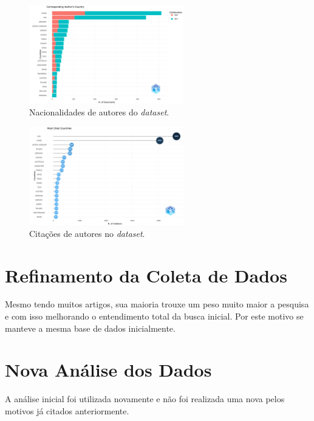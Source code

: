 \begin{figure}
    \centering
    \includegraphics[width=0.6\textwidth]{experiments/tucazorron/PesquisaBibliometrica/GNN/6.png}
    \caption{Nacionalidades de autores do \textit{dataset}.}
    \label{fig:GNN@tucazorron:nationalities}
\end{figure}

\begin{figure}
    \centering
    \includegraphics[width=0.6\textwidth]{experiments/tucazorron/PesquisaBibliometrica/GNN/7.png}
    \caption{Citações de autores no \textit{dataset}.}
    \label{fig:GNN@tucazorron:countries-citations}
\end{figure}

\section{Refinamento da Coleta de Dados}

Mesmo tendo muitos artigos, sua maioria trouxe um peso muito maior a pesquisa e com isso melhorando o entendimento total da busca inicial. Por este motivo se manteve a mesma base de dados inicialmente.

\section{Nova Análise dos Dados}

A análise inicial foi utilizada novamente e não foi realizada uma nova pelos motivos já citados anteriormente.
